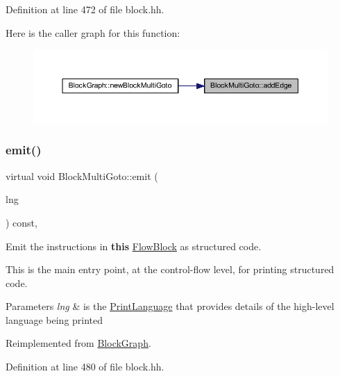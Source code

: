 Definition at line 472 of file block.\+hh.

Here is the caller graph for this function\+:
\nopagebreak
\begin{figure}[H]
\begin{center}
\leavevmode
\includegraphics[width=350pt]{class_block_multi_goto_ae44f2a0b73e918aa46dbae92d4eb67de_icgraph}
\end{center}
\end{figure}
\mbox{\label{class_block_multi_goto_a8eee38e26a13873ceaff6d37b46eaafd}} 
\subsubsection{\texorpdfstring{emit()}{emit()}}
{\footnotesize\ttfamily virtual void Block\+Multi\+Goto\+::emit (\begin{DoxyParamCaption}\item[{\mbox{\hyperlink{class_print_language}{Print\+Language}} $\ast$}]{lng }\end{DoxyParamCaption}) const\hspace{0.3cm}{\ttfamily [inline]}, {\ttfamily [virtual]}}



Emit the instructions in {\bfseries{this}} \mbox{\hyperlink{class_flow_block}{Flow\+Block}} as structured code. 

This is the main entry point, at the control-\/flow level, for printing structured code. 
\begin{DoxyParams}{Parameters}
{\em lng} & is the \mbox{\hyperlink{class_print_language}{Print\+Language}} that provides details of the high-\/level language being printed \\
\hline
\end{DoxyParams}


Reimplemented from \mbox{\hyperlink{class_block_graph_a535d3c7cb13e5e45b6e121b024fa339f}{Block\+Graph}}.



Definition at line 480 of file block.\+hh.

